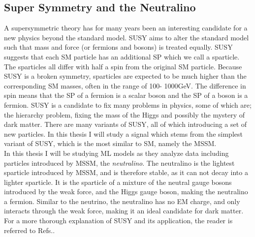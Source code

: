 \subsection{Super Symmetry and the Neutralino}\label{subsec:SS}
A supersymmetric theory has for many years been an interesting candidate for a new physics beyond the standard 
model. \ac{SUSY} aims to alter the standard model such that mass and force (or fermions and bosons) is treated equally. 
\ac{SUSY} suggests that each \ac{SM} particle has an additional \ac{SP} which we call a sparticle. 
The sparticles all differ with half a spin from the original \ac{SM} particle. Because \ac{SUSY} is a broken symmetry, 
sparticles are expected to be much higher than the corresponding \ac{SM} masses, often in the range of 100- 1000GeV. 
The difference in spin means that the \ac{SP} of a fermion is a scalar boson and the \ac{SP} of a boson is a fermion. \ac{SUSY} is a 
candidate to fix many problems in physics, some of which are; the hierarchy problem, fixing the mass of the Higgs 
and possibly the mystery of dark matter. There are many variants of \ac{SUSY}, all of which introducing a set of new 
particles. In this thesis I will study a signal which stems from the simplest variant of \ac{SUSY}, which is the most 
similar to \ac{SM}, namely the \ac{MSSM}. 
\\
In this thesis I will be studying \ac{ML} models as they analyze data including particles introduced by \ac{MSSM}, the \emph{neutralino}.
The neutralino is the lightest sparticle introduced by \ac{MSSM}, and is therefore stable, as it can not decay into a lighter sparticle. 
It is the sparticle of a mixture of the neutral gauge bosons introduced by the weak force, and the Higgs gauge boson, making the neutralino a 
fermion. Similar to the neutrino, the neutralino has no \ac{EM} charge, and only interacts through the weak force, making it an ideal candidate 
for dark matter. For a more thorough explanation of \ac{SUSY} and its application, the reader is referred to Refs.\cite{SUSY}. 